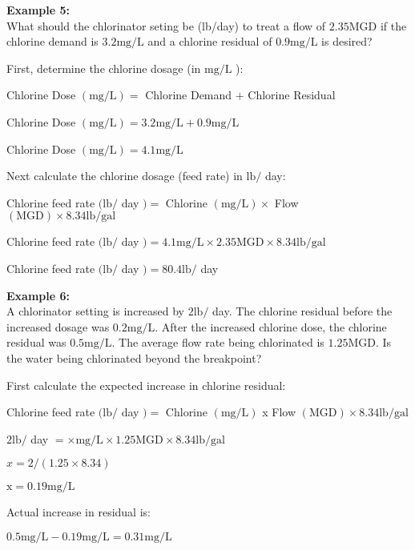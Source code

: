 \textbf{Example 5:}\\
What should the chlorinator seting be (lb/day) to treat a flow of $2.35 \mathrm{MGD}$ if the chlorine demand is $3.2 \mathrm{mg} / \mathrm{L}$ and a chlorine residual of $0.9 \mathrm{mg} / \mathrm{L}$ is desired?

First, determine the chlorine dosage (in $\mathrm{mg} / \mathrm{L}$ ):

Chlorine Dose $(\mathrm{mg} / \mathrm{L})=$ Chlorine Demand $+$ Chlorine Residual

Chlorine Dose $(\mathrm{mg} / \mathrm{L})=3.2 \mathrm{mg} / \mathrm{L}+0.9 \mathrm{mg} / \mathrm{L}$

Chlorine Dose $(\mathrm{mg} / \mathrm{L})=4.1 \mathrm{mg} / \mathrm{L}$

Next calculate the chlorine dosage (feed rate) in $\mathrm{lb} /$ day:

Chlorine feed rate $(\mathrm{lb} /$ day $)=$ Chlorine $(\mathrm{mg} / \mathrm{L}) \times$ Flow $(\mathrm{MGD}) \times 8.34 \mathrm{lb} / \mathrm{gal}$

Chlorine feed rate $(\mathrm{lb} /$ day $)=4.1 \mathrm{mg} / \mathrm{L} \times 2.35 \mathrm{MGD} \times 8.34 \mathrm{lb} / \mathrm{gal}$

Chlorine feed rate $(\mathrm{lb} /$ day $)=80.4 \mathrm{lb} /$ day


\textbf{Example 6:}\\
A chlorinator setting is increased by $2 \mathrm{lb} /$ day. The chlorine residual before the increased dosage was $0.2 \mathrm{mg} / \mathrm{L}$. After the increased chlorine dose, the chlorine residual was $0.5 \mathrm{mg} / \mathrm{L}$. The average flow rate being chlorinated is $1.25 \mathrm{MGD}$. Is the water being chlorinated beyond the breakpoint?

First calculate the expected increase in chlorine residual:

Chlorine feed rate $(\mathrm{lb} /$ day $)=$ Chlorine $(\mathrm{mg} / \mathrm{L})$ x Flow $(\mathrm{MGD}) \times 8.34 \mathrm{lb} / \mathrm{gal}$

$2 \mathrm{lb} /$ day $=\times \mathrm{mg} / \mathrm{L} \times 1.25 \mathrm{MGD} \times 8.34 \mathrm{lb} / \mathrm{gal}$

$x=2 /(1.25 \times 8.34)$

$\mathrm{x}=0.19 \mathrm{mg} / \mathrm{L}$

Actual increase in residual is:

$0.5 \mathrm{mg} / \mathrm{L}-0.19 \mathrm{mg} / \mathrm{L}=0.31 \mathrm{mg} / \mathrm{L}$

